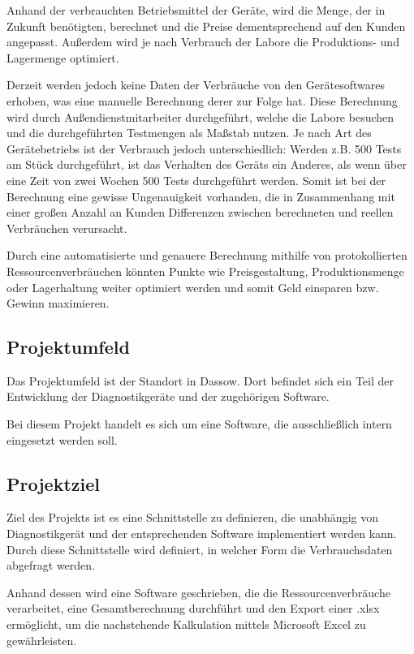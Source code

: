 Anhand der verbrauchten Betriebsmittel der Geräte, wird die Menge, der in Zukunft benötigten, berechnet und die Preise dementsprechend auf den Kunden angepasst. Außerdem wird je nach Verbrauch der Labore die Produktions- und Lagermenge optimiert.

Derzeit werden jedoch keine Daten der Verbräuche von den Gerätesoftwares erhoben, was eine manuelle Berechnung derer zur Folge hat. Diese Berechnung wird durch Außendienstmitarbeiter durchgeführt, welche die Labore besuchen und die durchgeführten Testmengen als Maßstab nutzen. Je nach Art des Gerätebetriebs ist der Verbrauch jedoch unterschiedlich: Werden z.B. 500 Tests am Stück durchgeführt, ist das Verhalten des Geräts ein Anderes, als wenn über eine Zeit von zwei Wochen 500 Tests durchgeführt werden. Somit ist bei der Berechnung eine gewisse Ungenauigkeit vorhanden, die in Zusammenhang mit einer großen Anzahl an Kunden Differenzen zwischen berechneten und reellen Verbräuchen verursacht. 

Durch eine automatisierte und genauere Berechnung mithilfe von protokollierten Ressourcenverbräuchen könnten Punkte wie Preisgestaltung, Produktionsmenge oder Lagerhaltung weiter optimiert werden und somit Geld einsparen bzw. Gewinn maximieren.

\subsection{Projektumfeld}
\label{sec:Projektumfeld}
Das Projektumfeld ist der {\betriebNameKzf} Standort in Dassow. Dort befindet sich ein Teil der Entwicklung der Diagnostikgeräte und der zugehörigen Software. 

Bei diesem Projekt handelt es sich um eine Software, die ausschließlich intern eingesetzt werden soll.

\subsection{Projektziel}
\label{sec:Projektziel}
Ziel des Projekts ist es eine Schnittstelle zu definieren, die unabhängig von Diagnostikgerät und der entsprechenden Software implementiert werden kann. Durch diese Schnittstelle wird definiert, in welcher Form die Verbrauchsdaten abgefragt werden.

Anhand dessen wird eine Software geschrieben, die die Ressourcenverbräuche verarbeitet, eine Gesamtberechnung durchführt und den Export einer \glqq .xlsx\grqq \xspace ermöglicht, um die nachstehende Kalkulation mittels Microsoft Excel zu gewährleisten.

